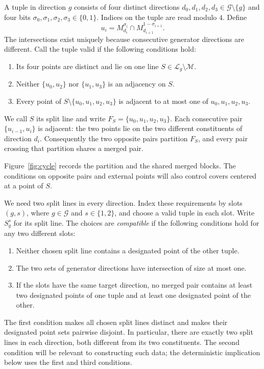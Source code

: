 A tuple in direction $g$ consists of four distinct directions
$d_0,d_1,d_2,d_3\in\mathcal G\setminus\{g\}$ and four bits
$\sigma_0,\sigma_1,\sigma_2,\sigma_3\in\{0,1\}$.  Indices on the tuple
are read modulo $4$.  Define
\begin{equation}
 u_i=M_{d_i}^{\sigma_i}\cap M_{d_{i+1}}^{1-\sigma_{i+1}}.
 \label{eq:det-tuple-points}
\end{equation}
The intersections exist uniquely because consecutive generator directions
are different.  Call the tuple valid if the following conditions hold:
\begin{enumerate}
 \item Its four points are distinct and lie on one line
 $S\in\mathcal L_g\setminus\mathcal M$.
 \item Neither $\{u_0,u_2\}$ nor $\{u_1,u_3\}$ is an adjacency on $S$.
 \item Every point of $S\setminus\{u_0,u_1,u_2,u_3\}$ is adjacent to at
 most one of $u_0,u_1,u_2,u_3$.
\end{enumerate}
We call $S$ its split line and write $F_S=\{u_0,u_1,u_2,u_3\}$.  Each
consecutive pair $\{u_{i-1},u_i\}$ is adjacent: the two points lie on the
two different constituents of direction $d_i$.  Consequently the two
opposite pairs partition $F_S$, and every pair crossing that partition
shares a merged pair.

Figure~\ref{fig:cycle} records the partition and the shared merged
blocks. The conditions on opposite pairs and external points will also
control covers centered at a point of $S$.

We need two split lines in every direction. Index these requirements by
slots $(g,s)$, where $g\in\mathcal G$ and
$s\in\{1,2\}$, and choose a valid tuple in each slot. Write $S_g^s$
for its split line.
The choices are \emph{compatible} if the following conditions hold for
any two different slots:
\begin{enumerate}
 \item Neither chosen split line contains a designated point of the other
 tuple.
 \item The two sets of generator directions have intersection of size at
 most one.
 \item If the slots have the same target direction, no merged pair
 contains at least two designated points of one tuple and at least one
 designated point of the other.
\end{enumerate}
The first condition makes all chosen split lines distinct and makes their
designated point sets pairwise disjoint.  In particular, there are exactly
two split lines in each direction, both different from its two
constituents.  The second condition will be relevant to constructing such
data; the deterministic implication below uses the first and third
conditions.

